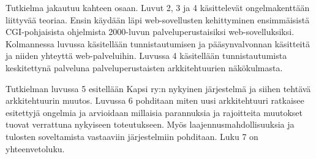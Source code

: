 Tutkielma jakautuu kahteen osaan. Luvut 2, 3 ja 4 käsittelevät ongelmakenttään liittyvää teoriaa. Ensin käydään läpi web-sovellusten kehittyminen ensimmäisistä CGI-pohjaisista ohjelmista 2000-luvun palveluperustaisiksi web-sovelluksiksi. Kolmannessa luvussa käsitellään tunnistautumisen ja pääsynvalvonnan käsitteitä ja niiden yhteyttä web-palveluihin. Luvussa 4 käsitellään tunnistautumista keskitettynä palveluna palveluperustaisten arkkitehtuurien näkökulmasta.

Tutkielman luvussa 5 esitellään Kapsi ry:n nykyinen järjestelmä ja siihen tehtävä arkkitehtuurin muutos. Luvussa 6 pohditaan miten uusi arkkitehtuuri ratkaisee esitettyjä ongelmia ja arvioidaan millaisia parannuksia ja rajoitteita muutokset tuovat verrattuna nykyiseen toteutukseen. Myös laajennusmahdollisuuksia ja tulosten soveltamista vastaaviin järjestelmiin pohditaan. Luku 7 on yhteenvetoluku.
